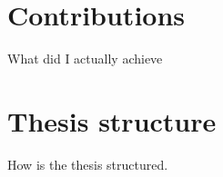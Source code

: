 \section{Contributions}

What did I actually achieve

\section{Thesis structure}

How is the thesis structured.













